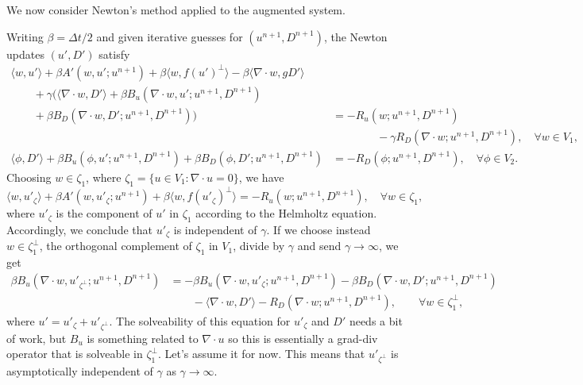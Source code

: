 \documentclass{article}
\begin{document}
We now consider Newton's method applied to the augmented system.

Writing $\beta=\Delta t/2$ and given iterative guesses for
$(u^{n+1},D^{n+1})$, the Newton updates $(u',D')$ satisfy
\begin{align}
  \nonumber
  \langle w, u' \rangle + \beta A'(w, u'; u^{n+1})
  + \beta\langle w, f(u')^{\perp}\rangle
  - \beta\langle \nabla\cdot w, gD'\rangle & \\
  \nonumber
  \qquad + \gamma\Big(
  \langle \nabla\cdot w, D' \rangle
  + \beta B_u(\nabla\cdot w, u'; u^{n+1},D^{n+1}) & \\
  \nonumber
  \qquad  + \beta B_D(\nabla\cdot w, D'; u^{n+1},D^{n+1})
  \Big)
  & = -R_u(w;u^{n+1},D^{n+1}) \\
  & \qquad \qquad - \gamma R_D(\nabla\cdot w;
  u^{n+1},D^{n+1}), \quad \forall w \in V_1, \\
  \langle \phi, D' \rangle
  + \beta B_u(\phi, u'; u^{n+1},D^{n+1})
  + \beta B_D(\phi, D'; u^{n+1},D^{n+1})
  & = -R_D(\phi; u^{n+1},D^{n+1}), \quad \forall \phi\in V_2.
\end{align}
Choosing $w \in \zeta_1$, where $\zeta_1=\{u\in V_1:\nabla\cdot u=0\}$,
we have
\begin{equation}
  \langle w, u'_\zeta\rangle + \beta A'(w,u'_\zeta; u^{n+1})
  + \beta\langle w, f(u'_\zeta)^\perp\rangle = -R_u(w; u^{n+1},D^{n+1}),
  \quad \forall w\in \zeta_1,
\end{equation}
where $u'_\zeta$ is the component of $u'$ in $\zeta_1$ according
to the Helmholtz equation. Accordingly, we conclude that $u'_\zeta$
is independent of $\gamma$. If we choose instead $w\in \zeta_1^\perp$,
the orthogonal complement of $\zeta_1$ in $V_1$, divide by $\gamma$
and send $\gamma\to \infty$, we get
\begin{align}
  \nonumber
   \beta B_u(\nabla\cdot w, u'_{\zeta^\perp}; u^{n+1},D^{n+1}) & = 
  -\beta B_u(\nabla\cdot w, u'_\zeta; u^{n+1},D^{n+1}) 
  - \beta B_D(\nabla\cdot w, D'; u^{n+1},D^{n+1}) \\
  & \qquad -\langle \nabla\cdot w, D' \rangle -R_D(\nabla\cdot w;u^{n+1},D^{n+1}), \qquad \forall w \in \zeta_1^\perp,
\end{align}
where $u' = u'_{\zeta} + u'_{\zeta^\perp}$.  The solveability of this
equation for $u'_{\zeta}$ and $D'$ needs a bit of work, but $B_u$ is
something related to $\nabla\cdot u$ so this is essentially a grad-div
operator that is solveable in $\zeta^{\perp}_1$. Let's assume it for
now. This means that $u'_{\zeta^\perp}$ is asymptotically independent
of $\gamma$ as $\gamma\to \infty$. 
\end{document}

